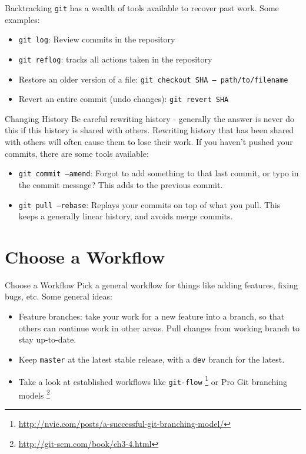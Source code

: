\documentclass{beamer}
\begin{document}
\begin{frame}{Backtracking}
  \texttt{git} has a wealth of tools available to recover past work. Some
  examples:
  \begin{itemize}
    \item \texttt{git log}: Review commits in the repository
    \pause
    \item \texttt{git reflog}: tracks all actions taken in the repository
    \pause
    \item Restore an older version of a file:
          \texttt{git checkout SHA -- path/to/filename}
    \pause
    \item Revert an entire commit (undo changes):
          \texttt{git revert SHA}
  \end{itemize}
\end{frame}

\begin{frame}{Changing History}
  Be careful rewriting history - generally the answer is never do this if this
  history is shared with others. Rewriting history that has been shared with
  others will often cause them to lose their work. If you haven't pushed your
  commits, there are some tools available:
  \begin{itemize}
    \item \texttt{git commit --amend}: Forgot to add something to that last
          commit, or typo in the commit message? This adds to the previous
          commit.
    \item \texttt{git pull --rebase}: Replays your commits on top of what you
          pull. This keeps a generally linear history, and avoids merge commits.
  \end{itemize}


\end{frame}

\section{Choose a Workflow}
\begin{frame}{Choose a Workflow}
  Pick a general workflow for things like adding features, fixing bugs, etc.
  Some general ideas:
  \pause
  \begin{itemize}
    \item Feature branches: take your work for a new feature into a branch, so
          that others can continue work in other areas. Pull changes from
          working branch to stay up-to-date.
    \pause
    \item Keep \texttt{master} at the latest stable release, with a \texttt{dev}
          branch for the latest.
    \pause
    \item Take a look at established workflows like \texttt{git-flow}
          \footnote{\href{http://nvie.com/posts/a-successful-git-branching-model/}
          {http://nvie.com/posts/a-successful-git-branching-model/}}
          or Pro Git branching models
          \footnote{\href{http://git-scm.com/book/ch3-4.html}
          {http://git-scm.com/book/ch3-4.html}}
  \end{itemize}

\end{frame}
\end{document}
